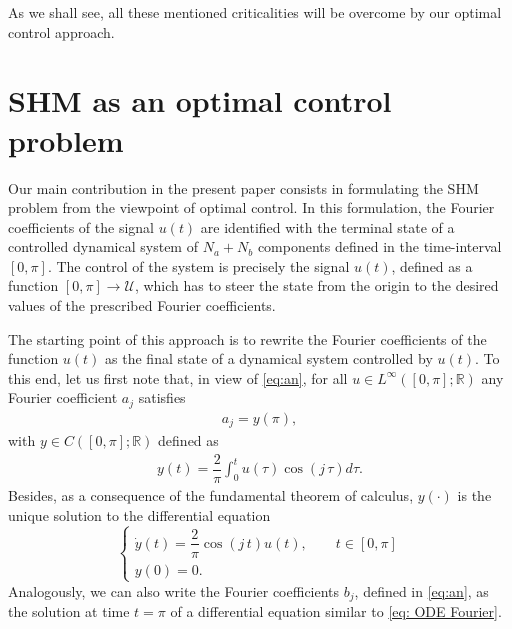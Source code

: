 \documentclass[twocolumn]{autart}    %
\begin{document}
%
% 
As we shall see, all these mentioned criticalities will be overcome by our optimal control approach.

\section{SHM as an optimal control problem}\label{sec:Contributions}

Our main contribution in the present paper consists in formulating the SHM problem from the viewpoint of optimal control. In this formulation, the Fourier coefficients of the signal $u(t)$ are identified with the terminal state of a controlled dynamical system of $N_a+N_b$ components defined in the time-interval $[0,\pi]$.  The control of the system is precisely the signal $u(t)$, defined as a function $[0,\pi]\to \mathcal{U}$, which has to steer the state from the origin to the desired values of the prescribed Fourier coefficients. 

The starting point of this approach is to rewrite the Fourier coefficients of the function $u(t)$ as the final state of a dynamical system controlled by $u(t)$. To this end, let us first note that, in view of \eqref{eq:an}, for all $u\in L^\infty ([0,\pi];\mathbb{R})$ any Fourier coefficient $a_j$ satisfies
\begin{align*}
	a_j = y(\pi), 
\end{align*}
with $y\in C([0,\pi];\mathbb{R})$ defined as
\begin{align*}
	y(t) = \dfrac{2}{\pi} \int_0^t u(\tau) \cos(j\, \tau) d\tau.
\end{align*}
Besides, as a consequence of the fundamental theorem of calculus, $y(\cdot)$ is the unique solution to the differential equation
\begin{equation}\label{eq: ODE Fourier}
	\begin{cases}
		\dot{y} (t) = \dfrac{2}{\pi} \cos(j\, t) u(t), \qquad  t\in [0,\pi]
		\\[5pt]
		y(0) = 0.
	\end{cases}
\end{equation}
Analogously, we can also write the Fourier coefficients $b_j$, defined in \eqref{eq:an}, as the solution at time $t=\pi$ of a differential equation similar to \eqref{eq: ODE Fourier}.
\end{document}
